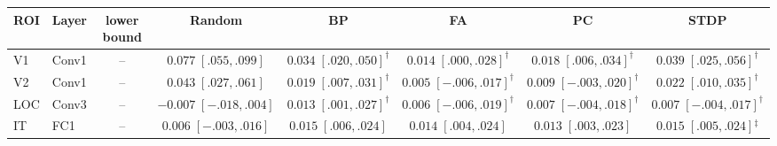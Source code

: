 \begin{tabular}{llcccccc}
\toprule
ROI & Layer & lower bound & Random & BP & FA & PC & STDP \\
\midrule
V1 & Conv1 & -- & $\mathbf{0.077}\;[.055,.099]$ & $0.034\;[.020,.050]^{\dagger}$ & $0.014\;[.000,.028]^{\dagger}$ & $0.018\;[.006,.034]^{\dagger}$ & $0.039\;[.025,.056]^{\dagger}$ \\
V2 & Conv1 & -- & $\mathbf{0.043}\;[.027,.061]$ & $0.019\;[.007,.031]^{\dagger}$ & $0.005\;[-.006,.017]^{\dagger}$ & $0.009\;[-.003,.020]^{\dagger}$ & $0.022\;[.010,.035]^{\dagger}$ \\
LOC & Conv3 & -- & $-0.007\;[-.018,.004]$ & $\mathbf{0.013}\;[.001,.027]^{\dagger}$ & $0.006\;[-.006,.019]^{\dagger}$ & $0.007\;[-.004,.018]^{\dagger}$ & $0.007\;[-.004,.017]^{\dagger}$ \\
IT & FC1 & -- & $0.006\;[-.003,.016]$ & $0.015\;[.006,.024]$ & $0.014\;[.004,.024]$ & $0.013\;[.003,.023]$ & $0.015\;[.005,.024]$$^{\ddagger}$ \\
\bottomrule
\end{tabular}
